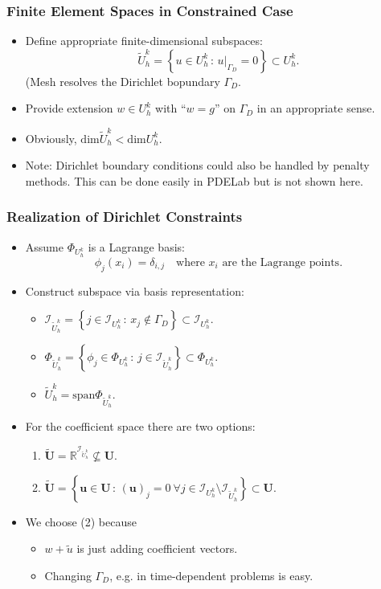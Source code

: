 \begin{frame}
\frametitle{Finite Element Spaces in Constrained Case}
\begin{itemize}
\item Define appropriate finite-dimensional subspaces:
\begin{equation*}
\tilde{U}_h^k = \left \{ u \in U_h^k \,:\, u|_{\Gamma_D} = 0 \right\} \subset U_h^k.
\end{equation*}
(Mesh resolves the Dirichlet bopundary $\Gamma_D$.
\item Provide extension $w\in U_h^k$ with ``$w=g$'' on $\Gamma_D$ in an appropriate sense.
\item Obviously, $\text{dim}\tilde{U}_h^k < \text{dim} U_h^k$.
\item Note: Dirichlet boundary conditions could also be handled by penalty methods. 
This can be done easily in PDELab but is not shown here. 
\end{itemize}
\end{frame}

\begin{frame}
\frametitle{Realization of Dirichlet Constraints}
\begin{itemize}
\item Assume $\Phi_{U_h^k}$ is a Lagrange basis: 
\begin{equation*}
\phi_j(x_i)=\delta_{i,j} \quad\text{where $x_i$ are the Lagrange points}.
\end{equation*}
\item Construct subspace via basis representation:
\begin{itemize}
\item $\mathcal{I}_{\tilde{U}_h^k} = \left\{ j\in \mathcal{I}_{U_h^k} \,:\, 
x_j \not\in \Gamma_D \right\} \subset \mathcal{I}_{U_h^k}$.
\item $\Phi_{\tilde{U}_h^k} = \left\{ \phi_j\in \Phi_{U_h^k} \,:\, 
j \in \mathcal{I}_{\tilde{U}_h^k} \right\} \subset \Phi_{U_h^k}$.
\item $\tilde{U}_h^k = \text{span}\Phi_{\tilde{U}_h^k}$.
\end{itemize}
\item For the coefficient space there are two options:
\begin{enumerate}
\item $\tilde{\mathbf{U}} = \mathbb{R}^{\mathcal{I}_{\tilde{U}_h^k}} \not\subseteq \mathbf{U}$.
\item $\tilde{\mathbf{U}} = \left\{ \mathbf{u}\in\mathbf{U} \,:\, (\mathbf{u})_j = 0 \  \forall
j \in \mathcal{I}_{U_h^k} \setminus \mathcal{I}_{\tilde{U}_h^k} \right\} \subset \mathbf{U}$. 
\end{enumerate}
\item We choose (2) because
\begin{itemize}
\item $w + \tilde{u}$ is just adding coefficient vectors.
\item Changing $\Gamma_D$, e.g. in time-dependent problems is easy.
\end{itemize}
\end{itemize}
\end{frame}


